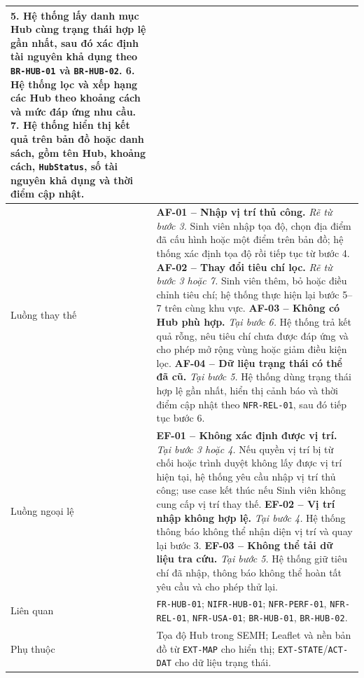\begin{longtable}{|L{26mm}|L{118mm}|}
    \textbf{5.} Hệ thống lấy danh mục Hub cùng trạng thái hợp lệ gần nhất, sau đó xác định tài nguyên khả dụng theo \texttt{BR-HUB-01} và \texttt{BR-HUB-02}.\newline
    \textbf{6.} Hệ thống lọc và xếp hạng các Hub theo khoảng cách và mức đáp ứng nhu cầu.\newline
    \textbf{7.} Hệ thống hiển thị kết quả trên bản đồ hoặc danh sách, gồm tên Hub, khoảng cách, \texttt{HubStatus}, số tài nguyên khả dụng và thời điểm cập nhật.\\\hline
  Luồng thay thế &
    \textbf{AF-01 -- Nhập vị trí thủ công.} \textit{Rẽ từ bước 3.} Sinh viên nhập tọa độ, chọn địa điểm đã cấu hình hoặc một điểm trên bản đồ; hệ thống xác định tọa độ rồi tiếp tục từ bước 4.\newline
    \textbf{AF-02 -- Thay đổi tiêu chí lọc.} \textit{Rẽ từ bước 3 hoặc 7.} Sinh viên thêm, bỏ hoặc điều chỉnh tiêu chí; hệ thống thực hiện lại bước 5--7 trên cùng khu vực.\newline
    \textbf{AF-03 -- Không có Hub phù hợp.} \textit{Tại bước 6.} Hệ thống trả kết quả rỗng, nêu tiêu chí chưa được đáp ứng và cho phép mở rộng vùng hoặc giảm điều kiện lọc.\newline
    \textbf{AF-04 -- Dữ liệu trạng thái có thể đã cũ.} \textit{Tại bước 5.} Hệ thống dùng trạng thái hợp lệ gần nhất, hiển thị cảnh báo và thời điểm cập nhật theo \texttt{NFR-REL-01}, sau đó tiếp tục bước 6.\\\hline
  Luồng ngoại lệ &
    \textbf{EF-01 -- Không xác định được vị trí.} \textit{Tại bước 3 hoặc 4.} Nếu quyền vị trí bị từ chối hoặc trình duyệt không lấy được vị trí hiện tại, hệ thống yêu cầu nhập vị trí thủ công; use case kết thúc nếu Sinh viên không cung cấp vị trí thay thế.\newline
    \textbf{EF-02 -- Vị trí nhập không hợp lệ.} \textit{Tại bước 4.} Hệ thống thông báo không thể nhận diện vị trí và quay lại bước 3.\newline
    \textbf{EF-03 -- Không thể tải dữ liệu tra cứu.} \textit{Tại bước 5.} Hệ thống giữ tiêu chí đã nhập, thông báo không thể hoàn tất yêu cầu và cho phép thử lại.\\\hline
  Liên quan & \texttt{FR-HUB-01}; \texttt{NIFR-HUB-01}; \texttt{NFR-PERF-01}, \texttt{NFR-REL-01}, \texttt{NFR-USA-01}; \texttt{BR-HUB-01}, \texttt{BR-HUB-02}.\\\hline
  Phụ thuộc & Tọa độ Hub trong SEMH; Leaflet và nền bản đồ từ \texttt{EXT-MAP} cho hiển thị; \texttt{EXT-STATE}/\texttt{ACT-DAT} cho dữ liệu trạng thái.\\\hline
\end{longtable}
\normalsize

